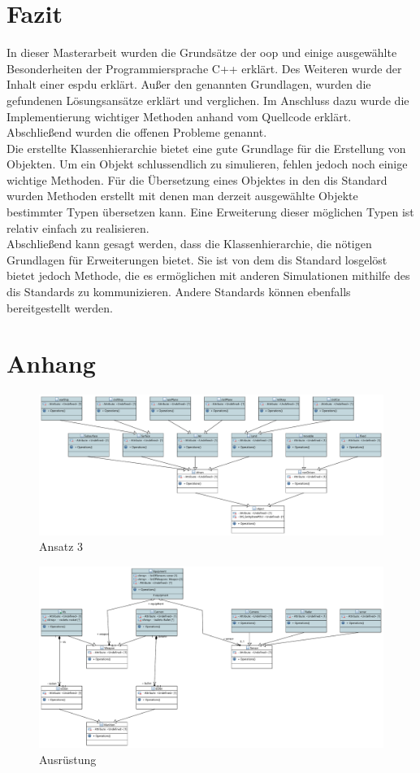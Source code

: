 \chapter{Fazit}
In dieser Masterarbeit wurden die Grundsätze der \acl{oop} und einige ausgewählte Besonderheiten der Programmiersprache C++ erklärt. Des Weiteren wurde der Inhalt einer \ac{espdu} erklärt. 
Außer den genannten Grundlagen, wurden die gefundenen Lösungsansätze erklärt und verglichen. Im Anschluss dazu wurde die Implementierung wichtiger Methoden anhand vom Quellcode erklärt. Abschließend wurden die offenen Probleme genannt. \\
Die erstellte Klassenhierarchie bietet eine gute Grundlage für die Erstellung von Objekten. Um ein Objekt schlussendlich zu simulieren, fehlen jedoch noch einige wichtige Methoden. Für die Übersetzung eines Objektes in den \ac{dis} Standard  wurden Methoden erstellt mit denen man derzeit ausgewählte Objekte bestimmter Typen übersetzen kann. Eine Erweiterung dieser möglichen Typen ist relativ einfach zu realisieren. \\
Abschließend kann gesagt werden, dass die Klassenhierarchie, die nötigen Grundlagen für Erweiterungen bietet. Sie ist von dem \ac{dis} Standard losgelöst bietet jedoch Methode, die es ermöglichen mit anderen Simulationen mithilfe des \ac{dis} Standards zu kommunizieren. Andere Standards können ebenfalls bereitgestellt werden. 


\chapter{Anhang}
\begin{figure}
	\centering
	\includegraphics[height = 0.75 \textheight,width =\textwidth]{bilder/pdfvorlagen/ansatz3}
	\caption[Ansatz 3]{Ansatz 3}
	\label{ansatz3}
\end{figure}


\begin{figure}
	\centering
	\includegraphics[height = 0.75\textheight,width =\textwidth]{bilder/pdfvorlagen/equip}
	\caption[Ausrüstung]{Ausrüstung}
	\label{ausrüstung}
\end{figure}
